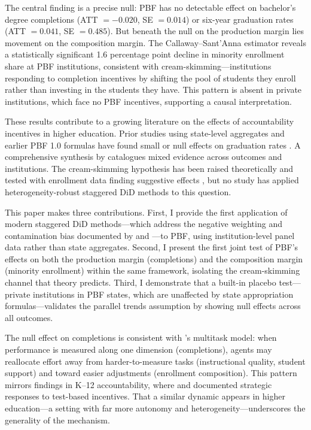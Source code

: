\documentclass[12pt]{article}
\begin{document}
The central finding is a precise null: PBF has no detectable effect on bachelor's degree completions (ATT $= -0.020$, SE $= 0.014$) or six-year graduation rates (ATT $= 0.041$, SE $= 0.485$). But beneath the null on the production margin lies movement on the composition margin. The Callaway--Sant'Anna estimator reveals a statistically significant 1.6 percentage point decline in minority enrollment share at PBF institutions, consistent with cream-skimming---institutions responding to completion incentives by shifting the pool of students they enroll rather than investing in the students they have. This pattern is absent in private institutions, which face no PBF incentives, supporting a causal interpretation.

These results contribute to a growing literature on the effects of accountability incentives in higher education. Prior studies using state-level aggregates and earlier PBF 1.0 formulas have found small or null effects on graduation rates \citep{hillman2015performance,tandberg2014state,umbricht2017performance}. A comprehensive synthesis by \citet{ortagus2020performance} catalogues mixed evidence across outcomes and institutions. The cream-skimming hypothesis has been raised theoretically \citep{dougherty2015performance,kelchen2018performance} and tested with enrollment data finding suggestive effects \citep{kelchen2018performance2,li2018unintended}, but no study has applied heterogeneity-robust staggered DiD methods to this question.

This paper makes three contributions. First, I provide the first application of modern staggered DiD methods---which address the negative weighting and contamination bias documented by \citet{goodman2021difference} and \citet{roth2023s}---to PBF, using institution-level panel data rather than state aggregates. Second, I present the first joint test of PBF's effects on both the production margin (completions) and the composition margin (minority enrollment) within the same framework, isolating the cream-skimming channel that theory predicts. Third, I demonstrate that a built-in placebo test---private institutions in PBF states, which are unaffected by state appropriation formulas---validates the parallel trends assumption by showing null effects across all outcomes.

The null effect on completions is consistent with \citet{holmstrom1991multitask}'s multitask model: when performance is measured along one dimension (completions), agents may reallocate effort away from harder-to-measure tasks (instructional quality, student support) and toward easier adjustments (enrollment composition). This pattern mirrors findings in K--12 accountability, where \citet{jacob2005accountability} and \citet{neal2010left} documented strategic responses to test-based incentives. That a similar dynamic appears in higher education---a setting with far more autonomy and heterogeneity---underscores the generality of the mechanism.
\end{document}
